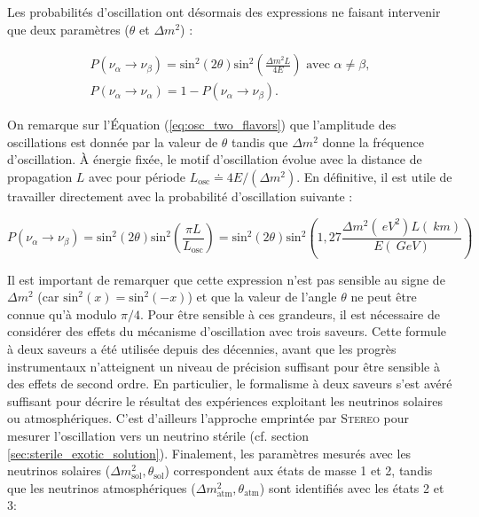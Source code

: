 \bigbreak

Les probabilités d'oscillation ont désormais des expressions ne faisant intervenir que  deux paramètres ($\theta$ et $\Delta m^2$) :

\begin{equation}
\label{eq:osc_two_flavors}
\begin{gathered}
    P(\nu_\alpha \rightarrow \nu_\beta ) = \textrm{sin}^2(2\theta)\textrm{sin}^2\left(\frac{\Delta m^2 L}{4E} \right) \textrm{ avec } \alpha \neq \beta ,\\
    P(\nu_\alpha \rightarrow \nu_\alpha ) = 1 - P(\nu_\alpha \rightarrow \nu_\beta ).
\end{gathered}
\end{equation}

\bigbreak

On remarque sur l'Équation (\ref{eq:osc_two_flavors}) que l'amplitude des oscillations est donnée par la valeur de $\theta$ tandis que $\Delta m^2$ donne la fréquence d'oscillation. À énergie fixée, le motif d'oscillation évolue avec la distance de propagation $L$ avec pour période $L_\textrm{osc} \doteq 4E/(\Delta m^2)$. En définitive, il est utile de travailler directement avec la probabilité d'oscillation suivante :

\begin{equation}
    P(\nu_\alpha \rightarrow \nu_\beta ) = \textrm{sin}^2(2\theta)\textrm{sin}^2\left(\frac{\pi L}{L_\textrm{osc}} \right) = \textrm{sin}^2(2\theta)\textrm{sin}^2\left(1,27 \frac{\Delta m^2(\SI{}{eV^2}) L(\SI{}{km})}{E (\SI{}{GeV})} \right)
\end{equation}

\bigbreak

Il est important de remarquer que cette expression n'est pas sensible au signe de $\Delta m^2$ (car $\textrm{sin}^2(x) = \textrm{sin}^2(-x)$) et que la valeur de l'angle $\theta$ ne peut être connue qu'à modulo $\pi/4$. Pour être sensible à ces grandeurs, il est nécessaire de considérer des effets du mécanisme d'oscillation avec trois saveurs. Cette formule à deux saveurs a été utilisée depuis des décennies, avant que les progrès instrumentaux n'atteignent un niveau de précision suffisant pour être sensible à des effets de second ordre. En particulier, le formalisme à deux saveurs s'est avéré suffisant pour décrire le résultat des expériences exploitant les neutrinos solaires ou atmosphériques. C'est d'ailleurs l'approche emprintée par \textsc{Stereo} pour mesurer l'oscillation vers un neutrino stérile (cf. section \ref{sec:sterile_exotic_solution}). Finalement, les paramètres mesurés avec les neutrinos solaires ($\Delta m^2_\textrm{sol} , \theta_\textrm{sol} $) correspondent aux états de masse 1 et 2, tandis que les neutrinos atmosphériques ($\Delta m^2_\textrm{atm} , \theta_\textrm{atm} $) sont identifiés avec les états 2 et 3:

